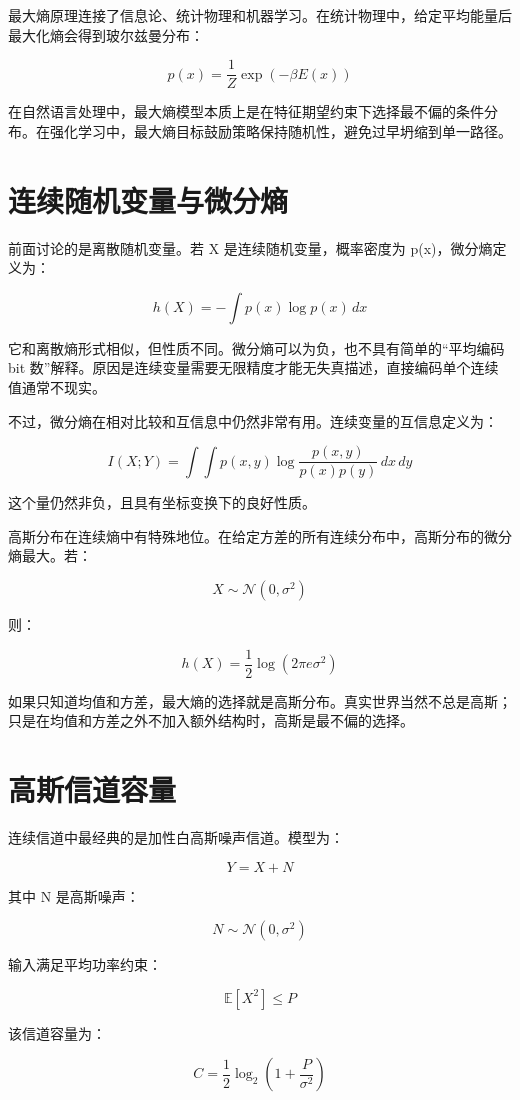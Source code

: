 最大熵原理连接了信息论、统计物理和机器学习。在统计物理中，给定平均能量后最大化熵会得到玻尔兹曼分布：

\[
p(x)=\frac{1}{Z}\exp(-\beta E(x))
\]

在自然语言处理中，最大熵模型本质上是在特征期望约束下选择最不偏的条件分布。在强化学习中，最大熵目标鼓励策略保持随机性，避免过早坍缩到单一路径。

\section{连续随机变量与微分熵}

前面讨论的是离散随机变量。若 X 是连续随机变量，概率密度为 p(x)，微分熵定义为：

\[
h(X)=-\int p(x)\log p(x)\,dx
\]

它和离散熵形式相似，但性质不同。微分熵可以为负，也不具有简单的“平均编码 bit 数”解释。原因是连续变量需要无限精度才能无失真描述，直接编码单个连续值通常不现实。

不过，微分熵在相对比较和互信息中仍然非常有用。连续变量的互信息定义为：

\[
I(X;Y)=\int\int p(x,y)\log\frac{p(x,y)}{p(x)p(y)}\,dx\,dy
\]

这个量仍然非负，且具有坐标变换下的良好性质。

高斯分布在连续熵中有特殊地位。在给定方差的所有连续分布中，高斯分布的微分熵最大。若：

\[
X\sim \mathcal{N}(0,\sigma^2)
\]

则：

\[
h(X)=\frac{1}{2}\log(2\pi e\sigma^2)
\]

如果只知道均值和方差，最大熵的选择就是高斯分布。真实世界当然不总是高斯；只是在均值和方差之外不加入额外结构时，高斯是最不偏的选择。

\section{高斯信道容量}

连续信道中最经典的是加性白高斯噪声信道。模型为：

\[
Y=X+N
\]

其中 N 是高斯噪声：

\[
N\sim \mathcal{N}(0,\sigma^2)
\]

输入满足平均功率约束：

\[
\mathbb{E}[X^2]\le P
\]

该信道容量为：

\[
C=\frac{1}{2}\log_2\left(1+\frac{P}{\sigma^2}\right)
\]

